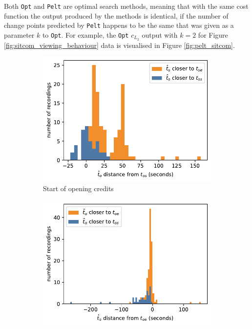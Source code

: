 Both \texttt{Opt} and \texttt{Pelt} are optimal search methods, meaning that with the same cost function the output produced by the methods is identical, if the number of change points predicted by \texttt{Pelt} happens to be the same that was given as a parameter $k$ to \texttt{Opt}. For example, the \texttt{Opt} $c_{L_2}$ output with $k=2$ for Figure \ref{fig:sitcom_viewing_behaviour} data is visualised in Figure \ref{fig:pelt_sitcom}.

\begin{figure}[H]
  \begin{subfigure}[t]{.49\textwidth}
    \centering
    \includegraphics[width=\linewidth]{../plots/distances/opt_l2_dist_start_first.pdf}
    \caption{Start of opening credits}
    \label{fig:t_diff_opt_os}
  \end{subfigure}
  \hfill
  \begin{subfigure}[t]{.49\textwidth}
    \centering
    \includegraphics[width=\linewidth]{../plots/distances/opt_l2_dist_start_last.pdf}

\end{subfigure}
\end{figure}
